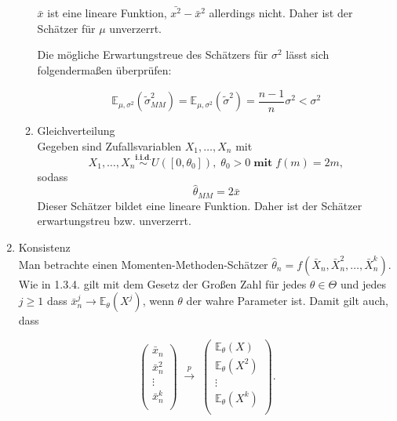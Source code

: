 \documentclass[10pt]{article}
\newcommand{\FZV}{X_1, \ldots, X_n} %
\newcommand{\EW}{\mathbb{E}} %
\newenvironment{BSP}[1][]
{\begin{Beispiel}[frametitle=#1]}{\end{Beispiel}}
\begin{document}
\begin{enumerate}
\begin{BSP}[Beispiel 1.3.3 (Erwartungstreue)]
\begin{enumerate}[label = (\roman*)]
			$\bar{x}$ ist eine lineare Funktion, $\bar{x^2}-\bar{x}^2$ allerdings nicht.  Daher ist der Schätzer für $\mu$ unverzerrt. 
			
			Die mögliche Erwartungstreue des Schätzers für $\sigma^2$ lässt sich folgendermaßen überprüfen:
			
			\begin{equation*}
				\EW_{\mu,\sigma^2} (\tilde{\sigma}^2_{MM}) = \EW_{\mu,\sigma^2} (\tilde{\sigma}^2) = \frac{n - 1 }{n} \sigma^2 < \sigma^2 
			\end{equation*}
			
			\item Gleichverteilung\\
			Gegeben sind Zufallsvariablen $\FZV$ mit
			\begin{equation*}
				\FZV \overset{\textbf{i.i.d.}}{\sim} U([0,\theta_0]), \; \theta_0 >0 \;\textbf{mit}\; f(m) = 2m,
			\end{equation*}
			sodass
			\begin{equation*}
				\hat{\theta}_{MM} = 2\bar{x}
			\end{equation*}
			Dieser Schätzer bildet eine lineare Funktion. Daher ist der Schätzer erwartungstreu bzw. unverzerrt. 
		\end{enumerate}	
	\end{BSP}


	
	\item Konsistenz \\
	Man betrachte einen Momenten-Methoden-Schätzer $\hat{\theta}_n = f(\bar{X}_n, \bar{X}^2_n, \ldots, \bar{X}^k_n)$. Wie in 1.3.4. gilt mit dem Gesetz der Großen Zahl für jedes $\theta \in \Theta$ und jedes $j \geq 1$ dass $\bar{x}^j_n \longrightarrow \EW_\theta (X^j)$, wenn $\theta$ der wahre Parameter ist. Damit gilt auch, dass
	
		\begin{equation*}
		\left(
		\begin{array}{c}
			\bar{x}_n\\
			\bar{x}^2_n\\
			\vdots\\
			\bar{x}^k_n\\
		\end{array}
		\right)\; \overset{p}\longrightarrow \;
		\left(
		\begin{array}{c}
			\EW_\theta(X)\\
			\EW_\theta(X^2)\\
			\vdots\\
			\EW_\theta(X^k) \\
		\end{array}
		\right).
	\end{equation*}


\end{enumerate}
\end{document}
